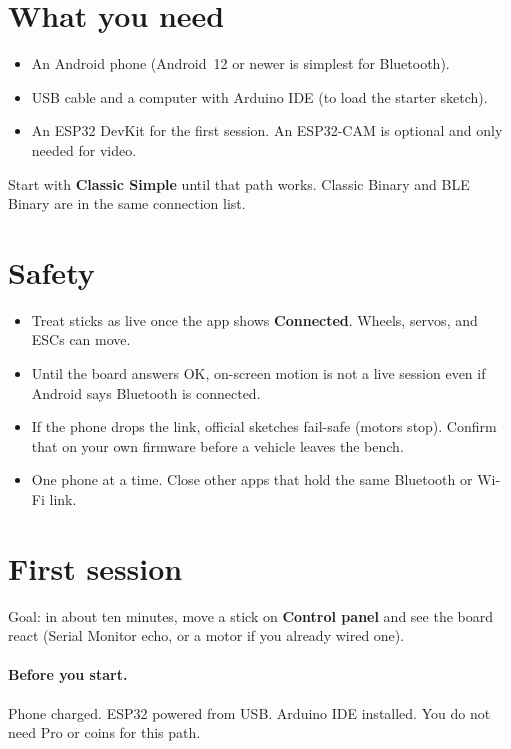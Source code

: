 \documentclass[12pt,a4paper]{article}
\newcommand{\ui}[1]{\textsf{\textbf{#1}}}
\begin{document}
\section{What you need}
\label{sec:need}

\begin{itemize}[leftmargin=1.4cm]
  \item An Android phone (Android~12 or newer is simplest for Bluetooth).
  \item USB cable and a computer with Arduino IDE (to load the starter sketch).
  \item An ESP32 DevKit for the first session.
        An ESP32-CAM is optional and only needed for video.
\end{itemize}

Start with \ui{Classic Simple} until that path works.
Classic Binary and BLE Binary are in the same connection list.

\section{Safety}
\label{sec:safety}

\begin{itemize}[leftmargin=1.4cm]
  \item Treat sticks as live once the app shows \ui{Connected}.
        Wheels, servos, and ESCs can move.
  \item Until the board answers OK, on-screen motion is not a live session
        even if Android says Bluetooth is connected.
  \item If the phone drops the link, official sketches fail-safe
        (motors stop). Confirm that on your own firmware before a vehicle
        leaves the bench.
  \item One phone at a time. Close other apps that hold the same Bluetooth
        or Wi-Fi link.
\end{itemize}

\section{First session}
\label{sec:first}

Goal: in about ten minutes, move a stick on \ui{Control panel} and see the
board react (Serial Monitor echo, or a motor if you already wired one).

\paragraph{Before you start.}
Phone charged. ESP32 powered from USB. Arduino IDE installed.
You do not need Pro or coins for this path.
\end{document}
